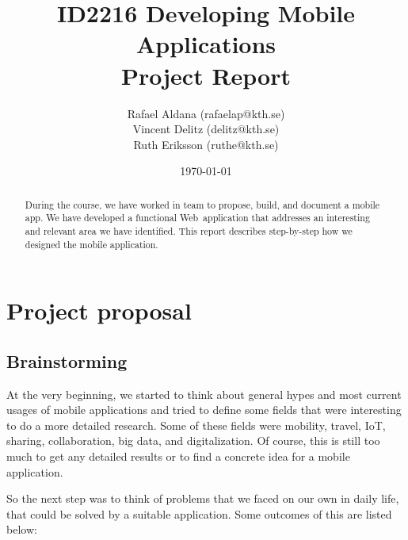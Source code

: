 \documentclass[11pt,twoside,a4paper]{report}
\begin{document}
\title{ID2216 Developing Mobile Applications\\Project Report}
\author{Rafael Aldana (rafaelap@kth.se)\\Vincent Delitz (delitz@kth.se)\\Ruth Eriksson (ruthe@kth.se)}
\date{\today}
\maketitle

\newcommand{\webOrNative}{Web~}

\begin{abstract}
During the course, we have worked in team to propose, build, and document a mobile app. We have developed a functional \webOrNative application that addresses an interesting and relevant area we have identified. This report describes step-by-step how we designed the mobile application.
\end{abstract}

\tableofcontents
\thispagestyle{empty}

\listoffigures
\thispagestyle{empty}


\renewcommand{\chaptername}{Assignment}
\setcounter{chapter}{0}
\chapter{Project proposal}
\setcounter{page}{1}

\section{Brainstorming}

At the very beginning, we started to think about general hypes and most current usages of mobile applications and tried to define some fields that were interesting to do a more detailed research. Some of these fields were mobility, travel, IoT, sharing, collaboration, big data, and digitalization. Of course, this is still too much to get any detailed results or to find a concrete idea for a mobile application.

So the next step was to think of problems that we faced on our own in daily life, that could be solved by a suitable application. Some outcomes of this are listed below:
\end{document}
